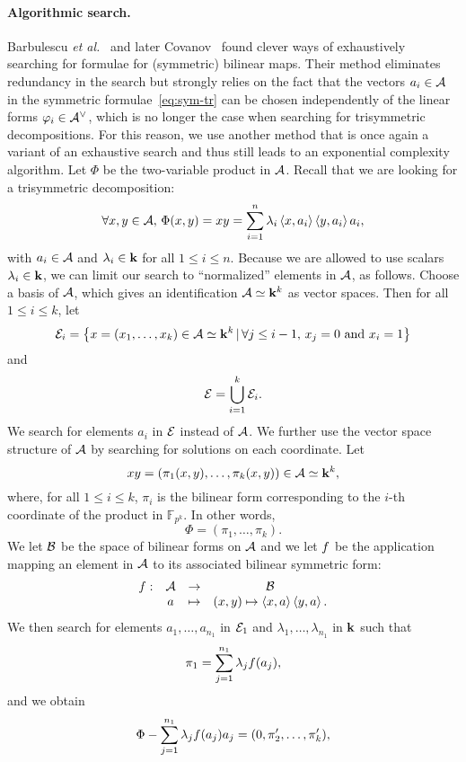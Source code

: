 \documentclass[11pt]{article}
\begin{document}
\paragraph{Algorithmic search.}
Barbulescu \emph{et al.}~\cite{BDEZ12} and later Covanov~\cite{Covanov19} found
clever ways of exhaustively searching for formulae for (symmetric) bilinear maps.
Their method eliminates redundancy in the search but strongly
relies on the fact that the vectors $a_i\in\mathcal{A}$ in 
the symmetric formulae~\eqref{eq:sym-tr} 
can be chosen independently of
the linear forms $\varphi_i\in\mathcal{A}^\vee$, which is no longer
the case when searching for trisymmetric decompositions. For this reason, we
use another method that is once again a variant of an exhaustive search and thus
still leads to an exponential complexity algorithm. Let
$\Phi$ be the two-variable product in $\mathcal{A}$. Recall
that we are looking for a trisymmetric decomposition:
\[
  \forall x, y\in\mathcal{A},\,\Phi(x, y) = xy =
  \sum_{i=1}^{n}\lambda_i\left\langle x,a_i\right\rangle\left\langle y,a_i\right\rangle a_i,
\]
with $a_i\in\mathcal{A}$ and $\lambda_i\in\mathbf{k}$ for all $1\leq i
\leq n$. Because we are allowed to use scalars $\lambda_i\in\mathbf{k}$, we
can limit our search to ``normalized'' elements in $\mathcal{A}$, as follows. Choose
a basis of $\mathcal{A}$, which gives an identification $\mathcal{A}\simeq\mathbf{k}^k$ as vector spaces. Then for all
$1\leq i\leq k$, let
\[
  \mathcal{E}_i=\left\{ x=(x_1, \dots, x_k)\in\mathcal{A}\simeq\mathbf{k}^k
  \,|\, \forall j\leq i-1,\,x_j=0\text{ and }x_i=1 \right\}
\]
and
\[
  \mathcal{E} = \bigcup_{i=1}^k\mathcal{E}_i.
\]
We search for elements $a_i$ in $\mathcal{E}$ instead of $\mathcal{A}$. We further
use the vector space structure of $\mathcal{A}$ by searching for solutions
on each coordinate.
Let 
\[
  xy = (\pi_1(x, y), \dots, \pi_k(x, y))\in\mathcal{A}\simeq\mathbf{k}^k,
\]
where, for all $1\leq i\leq k$, $\pi_i$ is the bilinear form corresponding to
the $i$-th coordinate of the product in $\mathbb{F}_{p^k}$. In other words, 
\[
  \Phi = (\pi_1, \dots, \pi_k).
\]
We let $\mathcal{B}$ be the space of bilinear forms on $\mathcal{A}$ and we let $f$ be the
application mapping an element in $\mathcal{A}$ to its associated bilinear symmetric
form:
\[
\begin{array}{cccc}
  f: & \mathcal{A} & \to & \mathcal{B} \\
  & a & \mapsto & (x, y)\mapsto \left\langle x,a\right\rangle\left\langle y,a\right\rangle.
\end{array}
\]
We then search for elements $a_1, \dots, a_{n_1}$ in $\mathcal{E}_1$ and
$\lambda_1, \dots, \lambda_{n_1}$ in $\mathbf{k}$ such that 
\begin{equation}
  \pi_1 = \sum_{j=1}^{n_1}\lambda_jf(a_j),
  \label{eq:pi1}
\end{equation}
and we obtain
\[
  \Phi-\sum_{j=1}^{n_1}\lambda_jf(a_j)a_j = (0, \pi_2', \dots, \pi_k'), 
\]
\end{document}
